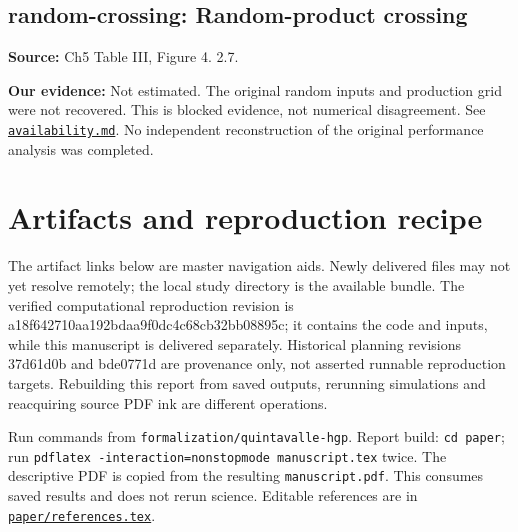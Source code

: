 \documentclass[11pt]{article}
\begin{document}
\subsection{random-crossing: Random-product crossing}
\label{claim:random-crossing}
\textbf{Source:} Ch5 Table III, Figure 4. 2.7.

\textbf{Our evidence:} Not estimated. The original random inputs and production grid were not recovered. This is blocked evidence, not numerical disagreement. See \href{https://github.com/alectionary/vibe-math/blob/master/formalization/quintavalle-hgp/availability.md}{\nolinkurl{availability.md}}. No independent reconstruction of the original performance analysis was completed.

\section{Artifacts and reproduction recipe}
The artifact links below are master navigation aids. Newly delivered files may not yet resolve remotely; the local study directory is the available bundle. The verified computational reproduction revision is a18f642710aa192bdaa9f0dc4c68cb32bb08895c; it contains the code and inputs, while this manuscript is delivered separately. Historical planning revisions 37d61d0b and bde0771d are provenance only, not asserted runnable reproduction targets. Rebuilding this report from saved outputs, rerunning simulations and reacquiring source PDF ink are different operations.

Run commands from \texttt{formalization/quintavalle-hgp}. Report build: \texttt{cd paper}; run \texttt{pdflatex -interaction=nonstopmode manuscript.tex} twice. The descriptive PDF is copied from the resulting \texttt{manuscript.pdf}. This consumes saved results and does not rerun science. Editable references are in \href{https://github.com/alectionary/vibe-math/blob/master/formalization/quintavalle-hgp/paper/references.tex}{\nolinkurl{paper/references.tex}}.
\end{document}
